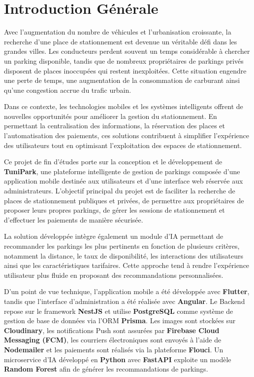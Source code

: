 \chapter*{Introduction Générale}

\par Avec l'augmentation du nombre de véhicules et l'urbanisation croissante, la recherche d'une place de stationnement est devenue un véritable défi dans les grandes villes. Les conducteurs perdent souvent un temps considérable à chercher un parking disponible, tandis que de nombreux propriétaires de parkings privés disposent de places inoccupées qui restent inexploitées. Cette situation engendre une perte de temps, une augmentation de la consommation de carburant ainsi qu'une congestion accrue du trafic urbain.

\par Dans ce contexte, les technologies mobiles et les systèmes intelligents offrent de nouvelles opportunités pour améliorer la gestion du stationnement. En permettant la centralisation des informations, la réservation des places et l'automatisation des paiements, ces solutions contribuent à simplifier l'expérience des utilisateurs tout en optimisant l'exploitation des espaces de stationnement.

\par Ce projet de fin d'études porte sur la conception et le développement de \textbf{TuniPark}, une plateforme intelligente de gestion de parkings composée d'une application mobile destinée aux utilisateurs et d'une interface web réservée aux administrateurs. L'objectif principal du projet est de faciliter la recherche de places de stationnement publiques et privées, de permettre aux propriétaires de proposer leurs propres parkings, de gérer les sessions de stationnement et d'effectuer les paiements de manière sécurisée.

\par La solution développée intègre également un module d'IA permettant de recommander les parkings les plus pertinents en fonction de plusieurs critères, notamment la distance, le taux de disponibilité, les interactions des utilisateurs ainsi que les caractéristiques tarifaires. Cette approche tend à rendre l'expérience utilisateur plus fluide en proposant des recommandations personnalisées.

\par D'un point de vue technique, l'application mobile a été développée avec \textbf{Flutter}, tandis que l'interface d'administration a été réalisée avec \textbf{Angular}. Le Backend repose sur le framework \textbf{NestJS} et utilise \textbf{PostgreSQL} comme système de gestion de base de données via l'ORM \textbf{Prisma}. Les images sont stockées sur \textbf{Cloudinary}, les notifications Push sont assurées par \textbf{Firebase Cloud Messaging (FCM)}, les courriers électroniques sont envoyés à l'aide de \textbf{Nodemailer} et les paiements sont réalisés via la plateforme \textbf{Flouci}. Un microservice d'IA développé en \textbf{Python} avec \textbf{FastAPI} exploite un modèle \textbf{Random Forest} afin de générer les recommandations de parkings.

